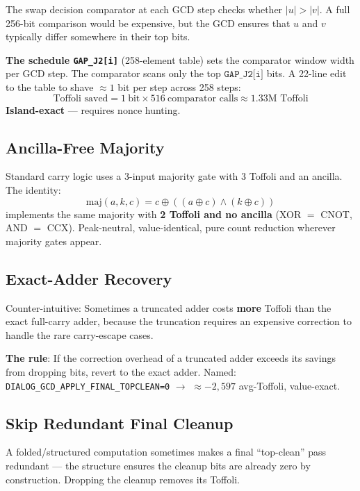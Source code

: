 \documentclass[11pt,a4paper]{article}
\begin{document}
The swap decision comparator at each GCD step checks whether $|u| > |v|$. A full 256-bit
comparison would be expensive, but the GCD ensures that $u$ and $v$ typically differ somewhere
in their top bits.

\textbf{The schedule \texttt{GAP\_J2[i]}} (258-element table) sets the comparator window width
per GCD step. The comparator scans only the top $\texttt{GAP\_J2[i]}$ bits. A 22-line edit to the
table to shave $\approx1$ bit per step across 258 steps:
\[
  \text{Toffoli saved} = 1\ \text{bit} \times 516\ \text{comparator calls} \approx 1.33\text{M Toffoli}
\]
\textbf{Island-exact} --- requires nonce hunting.

\subsection{Ancilla-Free Majority}
\label{sec:majority}

Standard carry logic uses a 3-input majority gate with 3 Toffoli and an ancilla. The identity:
\[
  \text{maj}(a, k, c) = c \oplus ((a \oplus c) \wedge (k \oplus c))
\]
implements the same majority with \textbf{2 Toffoli and no ancilla} (XOR $=$ CNOT, AND $=$ CCX).
Peak-neutral, value-identical, pure count reduction wherever majority gates appear.

\subsection{Exact-Adder Recovery}

Counter-intuitive: Sometimes a truncated adder costs \textbf{more} Toffoli than the exact
full-carry adder, because the truncation requires an expensive correction to handle the rare
carry-escape cases.

\textbf{The rule}: If the correction overhead of a truncated adder exceeds its savings from
dropping bits, revert to the exact adder. Named: \texttt{DIALOG\_GCD\_APPLY\_FINAL\_TOPCLEAN=0}
$\to$ $\approx{-2{,}597}$ avg-Toffoli, value-exact.

\subsection{Skip Redundant Final Cleanup}
\label{sec:skipclean}

A folded/structured computation sometimes makes a final ``top-clean'' pass redundant --- the
structure ensures the cleanup bits are already zero by construction. Dropping the cleanup removes
its Toffoli.
\end{document}
